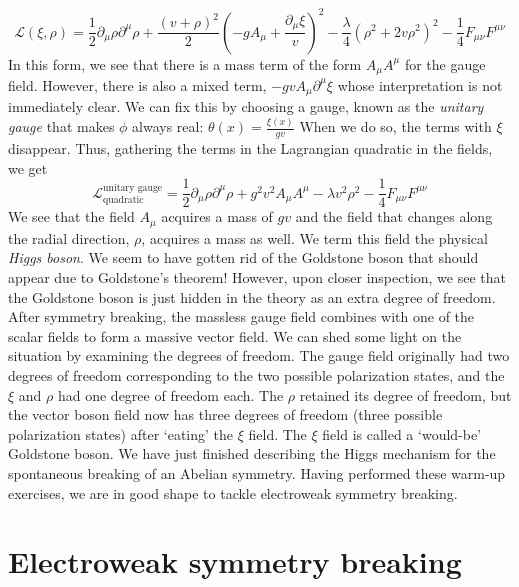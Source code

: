 \begin{equation*}
\mathcal{L}(\xi,\rho) = \frac{1}{2}\partial_\mu\rho\partial^\mu\rho + \frac{(v + \rho)^2}{2}%
\left(-gA_\mu+\frac{\partial_\mu\xi}{v}\right)^2-\frac{\lambda}{4}\left(\rho^2 + 2v\rho^2\right)^2%
-\frac{1}{4}F_{\mu\nu}F^{\mu\nu}
\end{equation*}
In this form, we see that there is a mass term of the form $A_\mu A^\mu$ for the gauge field. However, there is also a mixed term, $-gvA_\mu\partial^\mu\xi$ whose interpretation is not immediately clear. We can fix this by choosing a gauge, known as the \emph{unitary gauge} that makes $\phi$ always real:
$\theta(x) = \frac{\xi(x)}{gv}$
When we do so, the terms with $\xi$ disappear. Thus, gathering the terms in the Lagrangian quadratic in the fields, we get
\begin{equation}
\mathcal{L}_\text{quadratic}^\text{unitary gauge} = \frac{1}{2}\partial_\mu\rho\partial^\mu\rho + g^2v^2 A_\mu A^\mu - \lambda v^2\rho^2 - \frac{1}{4}F_{\mu\nu}F^{\mu\nu}
\end{equation}
We see that the field $A_\mu$ acquires a mass of $gv$ and the field that changes along the radial direction, $\rho$, acquires a mass as well. We term this field the physical \emph{Higgs boson}. We seem to have gotten rid of the Goldstone boson that should appear due to Goldstone’s theorem! However, upon closer inspection, we see that the Goldstone boson is just hidden in the theory as an extra degree of freedom. After symmetry breaking, the massless gauge field combines with one of the scalar fields to form a massive vector field. We can shed some light on the situation by examining the degrees of freedom. The gauge field originally had two degrees of freedom corresponding
to the two possible polarization states, and the $\xi$ and $\rho$ had one degree of freedom each. The $\rho$ retained its degree of freedom, but the vector boson field now has three degrees of freedom (three possible polarization states) after `eating' the $\xi$ field. The $\xi$ field is called a `would-be' Goldstone boson. We have just finished describing the Higgs mechanism for the spontaneous breaking of an Abelian symmetry. Having performed these warm-up exercises, we are in good shape to tackle electroweak symmetry breaking.

\section{Electroweak symmetry breaking}

